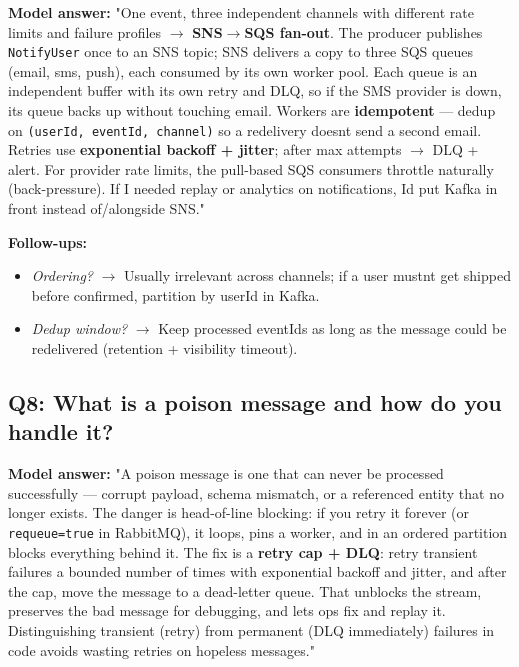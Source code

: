 \documentclass[11pt]{article}
\providecommand{\tightlist}{\setlength{\itemsep}{1pt}\setlength{\parskip}{0pt}}
\begin{document}
\textbf{Model answer:} "One event, three independent channels with different rate limits and failure profiles \(\rightarrow\) \textbf{SNS\(\rightarrow\)SQS fan-out}. The producer publishes \texttt{NotifyUser} once to an SNS topic; SNS delivers a copy to three SQS queues (email, sms, push), each consumed by its own worker pool. Each queue is an independent buffer with its own retry and DLQ, so if the SMS provider is down, its queue backs up without touching email. Workers are \textbf{idempotent} --- dedup on \texttt{(userId,\ eventId,\ channel)} so a redelivery doesn\textquotesingle t send a second email. Retries use \textbf{exponential backoff + jitter}; after max attempts \(\rightarrow\) DLQ + alert. For provider rate limits, the pull-based SQS consumers throttle naturally (back-pressure). If I needed replay or analytics on notifications, I\textquotesingle d put Kafka in front instead of/alongside SNS."

\textbf{Follow-ups:}

\begin{itemize}
\tightlist
\item
  \emph{Ordering?} \(\rightarrow\) Usually irrelevant across channels; if a user mustn\textquotesingle t get \textquotesingle shipped\textquotesingle{} before \textquotesingle confirmed,\textquotesingle{} partition by userId in Kafka.
\item
  \emph{Dedup window?} \(\rightarrow\) Keep processed eventIds as long as the message could be redelivered (retention + visibility timeout).
\end{itemize}

\subsection{Q8: What is a poison message and how do you handle it?}\label{q8-what-is-a-poison-message-and-how-do-you-handle-it}

\textbf{Model answer:} "A poison message is one that can never be processed successfully --- corrupt payload, schema mismatch, or a referenced entity that no longer exists. The danger is head-of-line blocking: if you retry it forever (or \texttt{requeue=true} in RabbitMQ), it loops, pins a worker, and in an ordered partition blocks everything behind it. The fix is a \textbf{retry cap + DLQ}: retry transient failures a bounded number of times with exponential backoff and jitter, and after the cap, move the message to a dead-letter queue. That unblocks the stream, preserves the bad message for debugging, and lets ops fix and replay it. Distinguishing transient (retry) from permanent (DLQ immediately) failures in code avoids wasting retries on hopeless messages."
\end{document}
